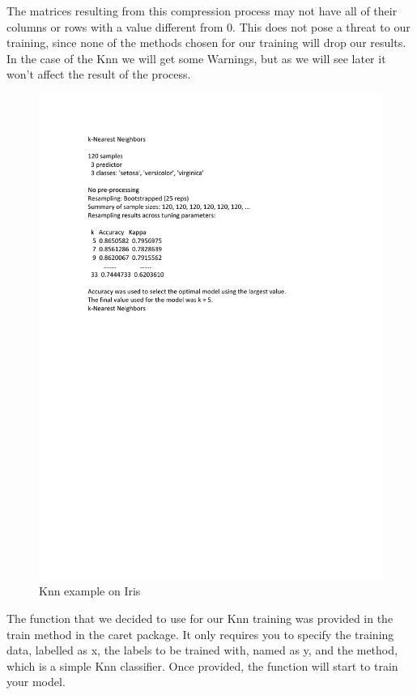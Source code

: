 \documentclass[12pt]{report}
\begin{document}
The matrices resulting from this compression process may not have all of their columns or rows with a value different from 0. This does not pose a threat to our training, since none of the methods chosen for our training will drop our results. In the case of the Knn  we will get some Warnings, but as we will see later it won't affect the result of the process. \par


\begin{figure}[H]
	\centering
	\includegraphics[width=15cm]{Figuras_tfg/Knn_example}
	\caption{Knn example on Iris}
	\label{fig:figure_Knn_Iris}
\end{figure}

The function that we decided to use for our Knn training was provided in the train method in the caret package. It only requires you to specify the training data, labelled as x, the labels to be trained with, named as y, and the method, which is a simple Knn classifier. Once provided, the function will start to train your model. \par
\end{document}
